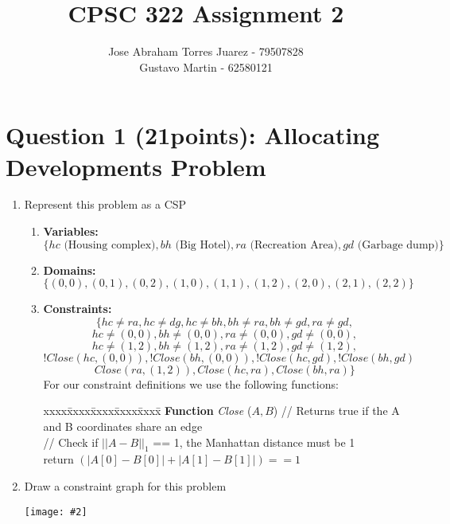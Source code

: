 \documentclass{article}
\def\ans#1{{\color{ans}#1}}
\newcommand{\centerfig}[2]{\begin{center}\texttt{[image: \#2]}\end{center}}
\begin{document}
\title{CPSC 322 Assignment 2}
\author{
    Jose Abraham Torres Juarez - 79507828 \\
    Gustavo Martin - 62580121
}
\date{}
\maketitle
\vspace{-2em}


\section{Question 1 (21points): Allocating Developments Problem}

\begin{enumerate}[label=(\alph*)]
    \item Represent this problem as a CSP
    \begin{enumerate}\color{ans}
        \item \textbf{Variables: }
        \[
            \{ hc \text{ (Housing complex)}, bh \text{ (Big Hotel)}, ra \text{ (Recreation Area)}, gd \text{ (Garbage dump)}\}
        \]
        \item \textbf{Domains: }
        \[
            \{ (0,0), (0,1), (0,2), (1,0), (1,1), (1,2), (2,0), (2,1), (2,2) \}
        \]
        \item \textbf{Constraints: }
        \[
            \{ hc \neq ra, hc \neq dg, hc \neq bh, bh \neq ra, bh \neq gd, ra \neq gd,
        \]
        \[
            hc \neq (0,0), bh \neq (0,0), ra \neq (0,0), gd \neq (0,0),
        \]
        \[
            hc \neq (1,2), bh \neq (1,2), ra \neq (1,2), gd \neq (1,2),
        \]
        \[
            !Close(hc,(0,0)), !Close(bh,(0,0)), !Close(hc,gd), !Close(bh,gd)
        \]
        \[
            Close(ra,(1,2)), Close(hc,ra), Close(bh,ra) \}
        \]
        \ans{
            For our constraint definitions we use the following functions:
        }
        \begin{tabbing}
        xxxx\=xxxx\=xxxx\=xxxx\=xxxx\= \kill \color{ans}
        {\bf Function} {\em Close} ($A,B$) // Returns true if the A and B coordinates share an edge \\ [0pt \color{ans}]
        \> // Check if $|| A - B ||_1$ == 1, the Manhattan distance must be 1\\
        \> return $( |A[0] - B[0]| + |A[1] - B[1]| ) == 1$ \\
        \end{tabbing}
    \end{enumerate}
    \item Draw a constraint graph for this problem
    \centerfig{0.8}{../figs/q1.png}
\end{enumerate}
\end{document}
